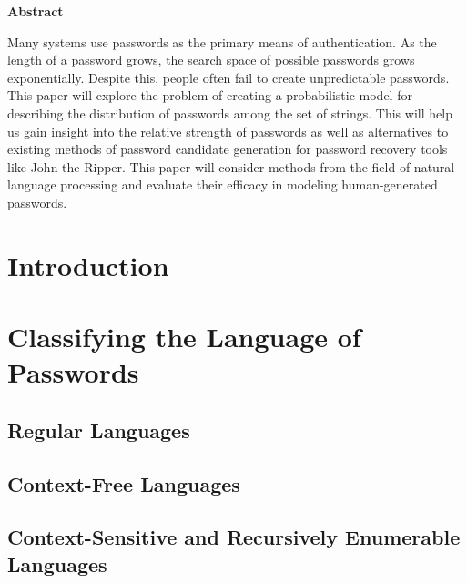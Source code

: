 \documentclass{amsart}
\newtheorem{thm}{Theorem}[section]
\theoremstyle{definition}
\theoremstyle{remark}
\numberwithin{equation}{section}
\begin{document}








\begin{center}\textbf{Abstract}\end{center}

Many systems use passwords as the primary means of authentication. As the length of a password grows, the search space of possible passwords grows exponentially. Despite this, people often fail to create unpredictable passwords. This paper will explore the problem of creating a probabilistic model for describing the distribution of passwords among the set of strings. This will help us gain insight into the relative strength of passwords as well as alternatives to existing methods of password candidate generation for password recovery tools like John the Ripper. This paper will consider methods from the field of natural language processing and evaluate their efficacy in modeling human-generated passwords.

\newpage

\tableofcontents

\newpage

\section{Introduction}
\section{Classifying the Language of Passwords}
\subsection{Regular Languages}
\subsection{Context-Free Languages}
\subsection{Context-Sensitive and Recursively Enumerable Languages}
\end{document}
